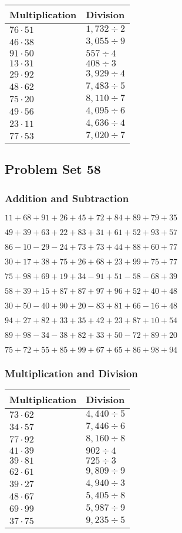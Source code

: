 \begin{longtable}[]{@{}ll@{}}
\toprule
Multiplication & Division\tabularnewline
\midrule
\endhead
\(76\cdot51\) & \(1,732÷2\)\tabularnewline
\(46\cdot38\) & \(3,055÷9\)\tabularnewline
\(91\cdot50\) & \(557÷4\)\tabularnewline
\(13\cdot31\) & \(408÷3\)\tabularnewline
\(29\cdot92\) & \(3,929÷4\)\tabularnewline
\(48\cdot62\) & \(7,483÷5\)\tabularnewline
\(75\cdot20\) & \(8,110 ÷7\)\tabularnewline
\(49\cdot56\) & \(4,095÷6\)\tabularnewline
\(23\cdot11\) & \(4,636÷4\)\tabularnewline
\(77\cdot53\) & \(7,020÷7\)\tabularnewline
\bottomrule
\end{longtable}

\hypertarget{problem-set-58}{%
\subsection{Problem Set 58}\label{problem-set-58}}

\hypertarget{addition-and-subtraction-98}{%
\subsubsection{Addition and
Subtraction}\label{addition-and-subtraction-98}}

\(11+68+91+26+45+72+84+89+79+ 35\)

\(49+39+63+22+83+31+61+52+93+57\)

\(86-10-29-24+73+73+44+88+60+77\)

\(30+17+38+75+26+68+23+99+75+77\)

\(75+98+69+19+34-91+51-58-68+39\)

\(58+39+15+87+87+97+96+52+40+48\)

\(30+50-40+90+20-83+81+66-16+48\)

\(94+27+82+33+35+42+23+87+10+54\)

\(89+98-34-38+82+33+50-72+89+20\)

\(75+72+55+85+99+67+65+86+98+94\)

\hypertarget{multiplication-and-division-98}{%
\subsubsection{Multiplication and
Division}\label{multiplication-and-division-98}}

\begin{longtable}[]{@{}ll@{}}
\toprule
Multiplication & Division\tabularnewline
\midrule
\endhead
\(73\cdot62\) & \(4,440÷5\)\tabularnewline
\(34\cdot57\) & \(7,446÷6\)\tabularnewline
\(77\cdot92\) & \(8,160÷8\)\tabularnewline
\(41\cdot39\) & \(902÷4\)\tabularnewline
\(39\cdot81\) & \(725÷3\)\tabularnewline
\(62\cdot61\) & \(9,809÷9\)\tabularnewline
\(39\cdot27\) & \(4,940÷3\)\tabularnewline
\(48\cdot67\) & \(5,405÷8\)\tabularnewline
\(69\cdot99\) & \(5,987÷9\)\tabularnewline
\(37\cdot75\) & \(9,235÷5\)\tabularnewline
\bottomrule
\end{longtable}

